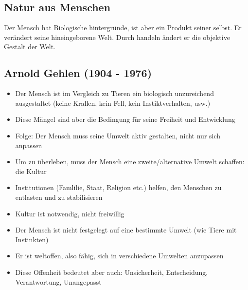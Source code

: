 \subsection{Natur aus Menschen}
Der Mensch hat Biologische hintergründe, ist aber ein Produkt seiner selbst. Er verändert seine hineingeborene Welt. Durch handeln ändert er die objektive Gestalt der Welt.

\subsection{Arnold Gehlen (1904 - 1976)}
\begin{itemize}
    \item Der Mensch ist im Vergleich zu Tieren ein biologisch unzureichend ausgestaltet (keine Krallen, kein Fell, kein Instiktverhalten, usw.)
    \item Diese Mängel sind aber die Bedingung für seine Freiheit und Entwicklung
    \item Folge: Der Mensch muss seine Umwelt aktiv gestalten, nicht nur sich anpassen
\end{itemize}

\begin{itemize}
    \item Um zu überleben, muss der Mensch eine zweite/alternative Umwelt schaffen: die Kultur
    \item Institutionen (Famlilie, Staat, Religion etc.) helfen, den Menschen zu entlasten und zu stabilisieren
    \item Kultur ist notwendig, nicht freiwillig
\end{itemize}

\begin{itemize}
    \item Der Mensch ist nicht festgelegt auf eine bestimmte Umwelt (wie Tiere mit Instinkten)
    \item Er ist weltoffen, also fähig, sich in verschiedene Umwelten anzupassen
    \item Diese Offenheit bedeutet aber auch: Unsicherheit, Entscheidung, Verantwortung, Unangepasst
\end{itemize}
